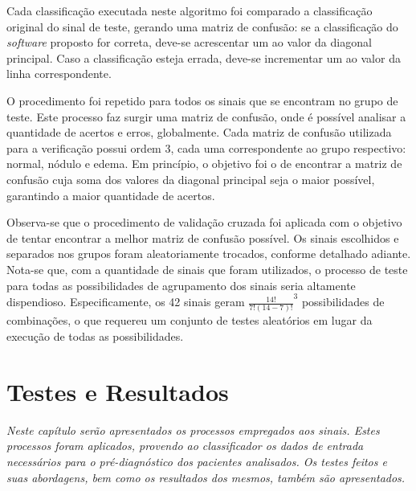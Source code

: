 \documentclass[a4paper,12pt,oneside]{report}
\begin{document}
\par Cada classifica\c{c}\~{a}o executada neste algoritmo foi comparado a classifica\c{c}\~{a}o original do sinal de teste, gerando uma matriz de confus\~{a}o: se a classifica\c{c}\~{a}o do \textit{software} proposto for correta, deve-se acrescentar um ao valor da diagonal principal. Caso a classifica\c{c}\~{a}o esteja errada, deve-se incrementar um ao valor da linha correspondente. 
\\
\par O procedimento foi repetido para todos os sinais que se encontram no grupo de teste. Este processo faz surgir uma matriz de confus\~{a}o, onde \'{e} poss\'{i}vel analisar a quantidade de acertos e erros, globalmente. Cada matriz de confus\~{a}o\cite{referencia_matriz_confusao} utilizada para a verifica\c{c}\~{a}o possui ordem 3, cada uma correspondente ao grupo respectivo: normal, n\'{o}dulo e edema. Em princ\'{i}pio, o objetivo foi o de encontrar a matriz de confus\~{a}o cuja soma dos valores da diagonal principal seja o maior pos\-s\'{i}\-vel, garantindo a maior quantidade de acertos. 
\\
\par Observa-se que o procedimento de valida\c{c}\~{a}o cruzada foi aplicada com o objetivo de tentar encontrar a melhor matriz de confus\~{a}o poss\'{i}vel. Os sinais escolhidos e separados nos grupos foram aleatoriamente trocados, conforme detalhado adiante. Nota-se que, com a quantidade de sinais que foram utilizados, o processo de teste para todas as possibilidades de agrupamento dos sinais seria altamente dispendioso. Especificamente, os 42 sinais geram $\frac{14!}{7! (14-7)!}^3$ possibilidades de combina\c{c}\~{o}es, o que requereu um conjunto de testes aleat\'{o}rios em lugar da execu\c{c}\~{a}o de todas as possibilidades.
\chapter{Testes e Resultados}
\label{chapter:tests}
\emph{Neste cap\'{i}tulo ser\~{a}o apresentados os processos empregados aos sinais. Estes processos foram aplicados, pro\-ven\-do ao clas\-si\-fi\-ca\-dor  os dados de entrada necess\'{a}rios para o pr\'{e}-diagn\'{o}stico dos pacientes analisados. Os testes feitos e suas abordagens, bem como os resultados dos mesmos, tamb\'{e}m s\~{a}o apresentados.}
\end{document}
